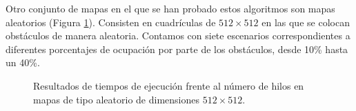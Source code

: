 \documentclass[a4paper,12pt]{article}
\begin{document}
Otro conjunto de mapas en el que se han probado estos algoritmos son mapas aleatorios (Figura \ref{random}). Consisten en cuadrículas de $512 \times 512$ en las que se colocan obstáculos de manera aleatoria. Contamos con siete escenarios correspondientes a diferentes porcentajes de ocupación por parte de los obstáculos, desde 10\% hasta un 40\%.

\begin{figure}[H]
    \centering
    \begin{subfigure}[b]{0.49\textwidth}
        
    \end{subfigure}
    \hfill
    \begin{subfigure}[b]{0.49\textwidth}
        
    \end{subfigure}

    \vspace{0.3em}
    
    \begin{subfigure}[b]{0.49\textwidth}
        
    \end{subfigure}
    \hfill
    \begin{subfigure}[b]{0.49\textwidth}
        
    \end{subfigure}

    \vspace{0.3em}

    \begin{subfigure}[b]{0.49\textwidth}
        
    \end{subfigure}
    \hfill
    \begin{subfigure}[b]{0.49\textwidth}
        
    \end{subfigure}

    \vspace{0.3em}

    \begin{subfigure}[b]{0.49\textwidth}
        
    \end{subfigure}

    \caption{Resultados de tiempos de ejecución frente al número de hilos en mapas de tipo aleatorio de dimensiones $512 \times 512$.}
    \label{random}
\end{figure}
\end{document}
